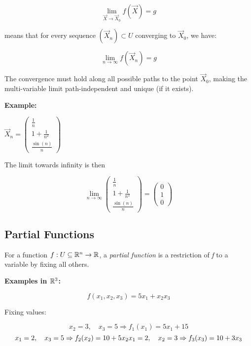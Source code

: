 \[
    \lim_{\vec{X} \to \vec{X}_0} f(\vec{X}) = g
\]

means that for every sequence \( (\vec{X}_n) \subset U \) converging to \( \vec{X}_0 \), we have:

\[
    \lim_{n \to \infty} f(\vec{X}_n) = g
\]

The convergence must hold along all possible paths to the point \( \vec{X}_0 \), making the 
multi-variable limit path-independent and unique (if it exists).
\vspace{\baselineskip}

\textbf{Example:}
\vspace{\baselineskip}

\(\vec{X}_n = \begin{pmatrix} \frac{1}{n} \\ 1 + \frac{1}{n^2} \\ \frac{\sin(n)}{n} \end{pmatrix}\)
\vspace{\baselineskip}

The limit towards infinity is then 

\[
    \lim_{n \to \infty} \begin{pmatrix} \frac{1}{n} \\ 1 + \frac{1}{n^2} \\ \frac{\sin(n)}{n} \end{pmatrix}
    = \begin{pmatrix}
        0 \\ 1 \\ 0
    \end{pmatrix}
\]

\subsection{Partial Functions}

For a function \( f: U \subseteq \mathbb{R}^n \to \mathbb{R} \), a \emph{partial function} is a 
restriction of \emph{f} to a variable by fixing all others.
\vspace{\baselineskip}

\textbf{Examples in \( \mathbb{R}^3 \):}

\[
    f(x_1, x_2, x_3) = 5x_1 + x_2 x_3
\]

Fixing values:

\[
    x_2 = 3, \quad x_3 = 5 \Rightarrow f_1(x_1) = 5x_1 + 15 
\]
\[
    x_1 = 2, \quad x_3 = 5 \Rightarrow f_2(x_2) = 10 + 5x_2 \\
    x_1 = 2, \quad x_2 = 3 \Rightarrow f_3(x_3) = 10 + 3x_3
\]

